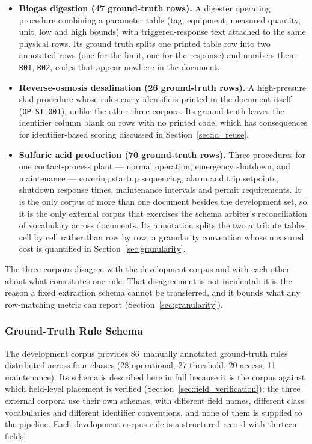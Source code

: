 \documentclass[11pt]{article}
\begin{document}
\begin{itemize}
    \item \textbf{Biogas digestion (47 ground-truth rows).} A digester operating
          procedure combining a parameter table (tag, equipment, measured
          quantity, unit, low and high bounds) with triggered-response text
          attached to the same physical rows. Its ground truth splits one printed
          table row into two annotated rows (one for the limit, one for the
          response) and numbers them \texttt{R01}, \texttt{R02}, codes that
          appear nowhere in the document.

    \item \textbf{Reverse-osmosis desalination (26 ground-truth rows).} A
          high-pressure skid procedure whose rules carry identifiers printed in
          the document itself (\texttt{OP-ST-001}), unlike the other three
          corpora. Its ground truth leaves the identifier column blank on rows
          with no printed code, which has consequences for identifier-based
          scoring discussed in Section~\ref{sec:id_reuse}.

    \item \textbf{Sulfuric acid production (70 ground-truth rows).} Three
          procedures for one contact-process plant --- normal operation,
          emergency shutdown, and maintenance --- covering startup sequencing,
          alarm and trip setpoints, shutdown response times, maintenance
          intervals and permit requirements. It is the only corpus of more than
          one document besides the development set, so it is the only external
          corpus that exercises the schema arbiter's reconciliation of
          vocabulary across documents. Its annotation splits the two attribute
          tables cell by cell rather than row by row, a granularity convention
          whose measured cost is quantified in
          Section~\ref{sec:granularity}.
\end{itemize}

The three corpora disagree with the development corpus and with each other about
what constitutes one rule. That disagreement is not incidental: it is the
reason a fixed extraction schema cannot be transferred, and it bounds what any
row-matching metric can report (Section~\ref{sec:granularity}).

\subsubsection{Ground-Truth Rule Schema}
\label{sec:gt_schema}
The development corpus provides 86~manually annotated ground-truth rules
distributed across four classes (28 operational, 27 threshold, 20 access, 11
maintenance). Its schema is described here in full because it is the corpus
against which field-level placement is verified
(Section~\ref{sec:field_verification}); the three external corpora use their own
schemas, with different field names, different class vocabularies and different
identifier conventions, and none of them is supplied to the pipeline. Each
development-corpus rule is a structured record with thirteen fields:
\end{document}
